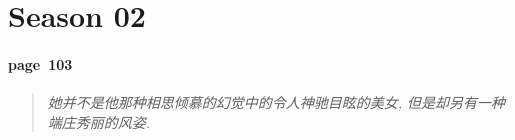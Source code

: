 \section{Season 02}

\paragraph*{page~103}
\begin{quotation}
    \itshape
    她并不是他那种相思倾慕的幻觉中的令人神驰目眩的美女, 但是却另有一种端庄秀丽的风姿. 
\end{quotation}

